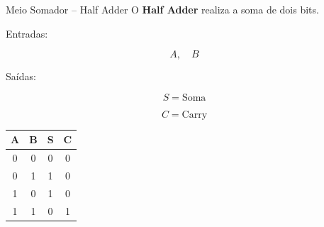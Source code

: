 \begin{frame}{Meio Somador -- Half Adder}
    O \textbf{Half Adder} realiza a soma de dois bits.

    Entradas:

    \[
        A,\quad B
    \]

    Saídas:

    \[
        S=\text{Soma}
    \]

    \[
        C=\text{Carry}
    \]

    \begin{center}
        \begin{tabular}{c c | c c}
            \hline
            A & B & S & C \\
            \hline
            0 & 0 & 0 & 0 \\
            0 & 1 & 1 & 0 \\
            1 & 0 & 1 & 0 \\
            1 & 1 & 0 & 1 \\
            \hline
        \end{tabular}
    \end{center}

\end{frame}